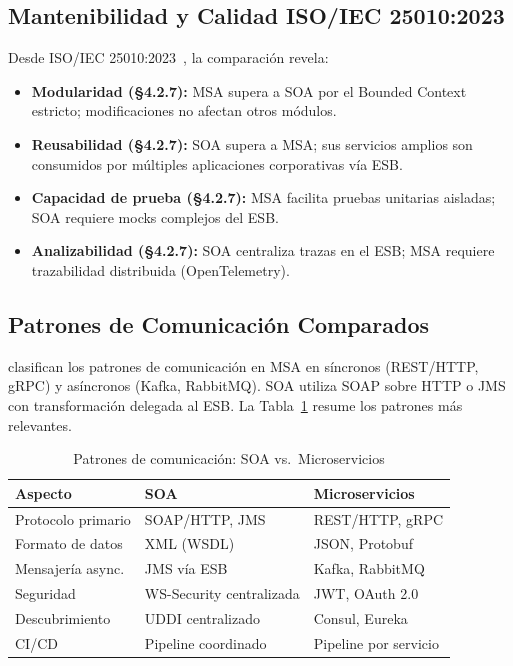 \documentclass[conference,a4paper]{IEEEtran}
\begin{document}
\subsection{Mantenibilidad y Calidad ISO/IEC 25010:2023}

Desde ISO/IEC 25010:2023~\cite{iso25010}, la comparaci\'on revela:

\begin{itemize}[leftmargin=*]
  \item \textbf{Modularidad (\S4.2.7):} MSA supera a SOA por el
    Bounded Context estricto; modificaciones no afectan otros
    m\'odulos.
  \item \textbf{Reusabilidad (\S4.2.7):} SOA supera a MSA; sus
    servicios amplios son consumidos por m\'ultiples aplicaciones
    corporativas v\'ia ESB.
  \item \textbf{Capacidad de prueba (\S4.2.7):} MSA facilita
    pruebas unitarias aisladas; SOA requiere mocks complejos del ESB.
  \item \textbf{Analizabilidad (\S4.2.7):} SOA centraliza trazas
    en el ESB; MSA requiere trazabilidad distribuida (OpenTelemetry).
\end{itemize}

\subsection{Patrones de Comunicaci\'on Comparados}

\textcite{aksakalli2021} clasifican los patrones de comunicaci\'on
en MSA en s\'incronos (REST/HTTP, gRPC) y as\'incronos
(Kafka, RabbitMQ). SOA utiliza SOAP sobre HTTP o JMS con
transformaci\'on delegada al ESB. La Tabla~\ref{tab:comunicacion}
resume los patrones m\'as relevantes.

\begin{table}[H]
\centering
\caption{Patrones de comunicaci\'on: SOA vs.\ Microservicios}
\label{tab:comunicacion}
\renewcommand{\arraystretch}{1.25}
\begin{tabularx}{\columnwidth}{>{\footnotesize}X >{\footnotesize}X
                               >{\footnotesize}X}
\toprule
\textbf{Aspecto}        & \textbf{SOA}              & \textbf{Microservicios} \\
\midrule
Protocolo primario      & SOAP/HTTP, JMS            & REST/HTTP, gRPC \\
Formato de datos        & XML (WSDL)                & JSON, Protobuf \\
Mensajer\'ia async.     & JMS v\'ia ESB             & Kafka, RabbitMQ \\
Seguridad               & WS-Security centralizada  & JWT, OAuth 2.0 \\
Descubrimiento          & UDDI centralizado         & Consul, Eureka \\
CI/CD                   & Pipeline coordinado       & Pipeline por servicio \\
\bottomrule
\end{tabularx}
\end{table}
\end{document}
